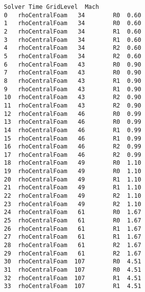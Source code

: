 \documentclass[11pt]{article}
\begin{document}
\begin{tcolorbox}[breakable, size=fbox, boxrule=.5pt, pad at break*=1mm, opacityfill=0]
\begin{Verbatim}[commandchars=\\\{\}]
            Solver Time GridLevel  Mach
0   rhoCentralFoam   34        R0  0.60
1   rhoCentralFoam   34        R0  0.60
2   rhoCentralFoam   34        R1  0.60
3   rhoCentralFoam   34        R1  0.60
4   rhoCentralFoam   34        R2  0.60
5   rhoCentralFoam   34        R2  0.60
6   rhoCentralFoam   43        R0  0.90
7   rhoCentralFoam   43        R0  0.90
8   rhoCentralFoam   43        R1  0.90
9   rhoCentralFoam   43        R1  0.90
10  rhoCentralFoam   43        R2  0.90
11  rhoCentralFoam   43        R2  0.90
12  rhoCentralFoam   46        R0  0.99
13  rhoCentralFoam   46        R0  0.99
14  rhoCentralFoam   46        R1  0.99
15  rhoCentralFoam   46        R1  0.99
16  rhoCentralFoam   46        R2  0.99
17  rhoCentralFoam   46        R2  0.99
18  rhoCentralFoam   49        R0  1.10
19  rhoCentralFoam   49        R0  1.10
20  rhoCentralFoam   49        R1  1.10
21  rhoCentralFoam   49        R1  1.10
22  rhoCentralFoam   49        R2  1.10
23  rhoCentralFoam   49        R2  1.10
24  rhoCentralFoam   61        R0  1.67
25  rhoCentralFoam   61        R0  1.67
26  rhoCentralFoam   61        R1  1.67
27  rhoCentralFoam   61        R1  1.67
28  rhoCentralFoam   61        R2  1.67
29  rhoCentralFoam   61        R2  1.67
30  rhoCentralFoam  107        R0  4.51
31  rhoCentralFoam  107        R0  4.51
32  rhoCentralFoam  107        R1  4.51
33  rhoCentralFoam  107        R1  4.51
\end{Verbatim}
\end{tcolorbox}
        
\end{document}
